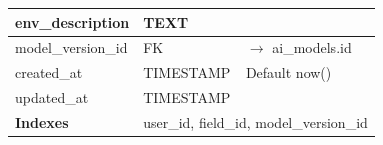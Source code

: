 \documentclass[12pt,a4paper]{article}
\begin{document}
\begin{longtable}{|l|l|l|p{5.5cm}|}
    \hline
    env\_description     & TEXT                                                         &                                         &                               \\
    \hline
    model\_version\_id   & FK                                                           & $\rightarrow$ ai\_models.id             &                               \\
    \hline
    created\_at          & TIMESTAMP                                                    & Default now()                           &                               \\
    \hline
    updated\_at          & TIMESTAMP                                                    &                                         &                               \\
    \hline
    \rowcolor{headerblue}
    \textbf{Indexes}     & \multicolumn{3}{l|}{user\_id, field\_id, model\_version\_id}                                                                           \\
    \hline
\end{longtable}
\end{document}
